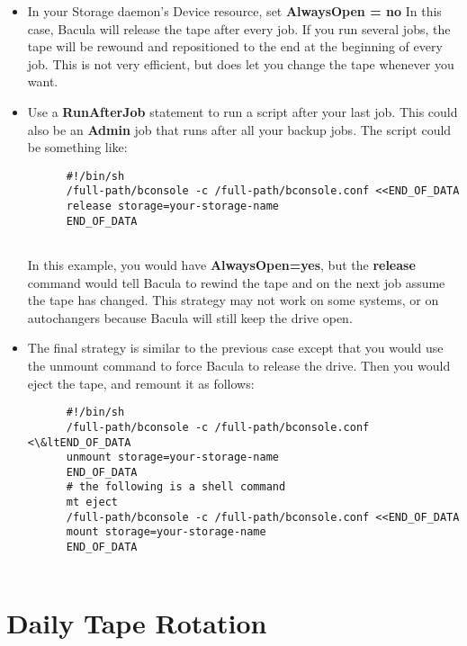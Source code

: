 \begin{itemize}
\item In your Storage daemon's Device resource, set
   {\bf AlwaysOpen = no}
   In this case, Bacula will release the tape after  every job. If you run
   several jobs, the tape will be  rewound and repositioned to the end at the
   beginning  of every job. This is not very efficient, but does let  you change
   the tape whenever you want.  
\item Use a {\bf RunAfterJob} statement to run a script after  your last job.
   This could also be an {\bf Admin}  job that runs after all your backup jobs.
   The script could be  something like:  

\footnotesize
\begin{verbatim}
      #!/bin/sh
      /full-path/bconsole -c /full-path/bconsole.conf <<END_OF_DATA
      release storage=your-storage-name
      END_OF_DATA
      
\end{verbatim}
\normalsize

In this example, you would have {\bf AlwaysOpen=yes},  but the {\bf release}
command would tell Bacula to  rewind the tape and on the next job assume the
tape  has changed. This strategy may not work on some systems,  or on
autochangers because Bacula will still keep the  drive open.  
\item The final strategy is similar to the previous  case except that you
   would use the unmount command  to force Bacula to release the drive. Then you
   would  eject the tape, and remount it as follows:  

\footnotesize
\begin{verbatim}
      #!/bin/sh
      /full-path/bconsole -c /full-path/bconsole.conf <\&ltEND_OF_DATA
      unmount storage=your-storage-name
      END_OF_DATA
      # the following is a shell command
      mt eject
      /full-path/bconsole -c /full-path/bconsole.conf <<END_OF_DATA
      mount storage=your-storage-name
      END_OF_DATA
      
\end{verbatim}
\normalsize

\end{itemize}

\label{Daily}

\section{Daily Tape Rotation}

